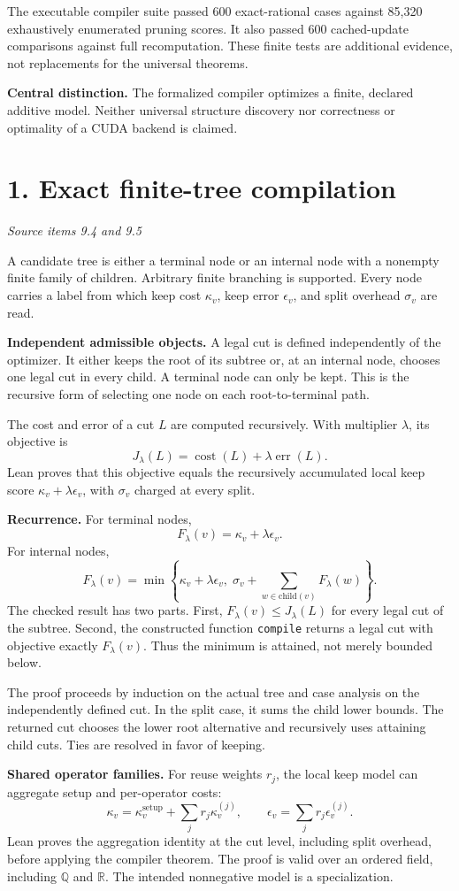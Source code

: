 \documentclass[11pt]{article}
\newcommand{\R}{\mathbb R}\newcommand{\Q}{\mathbb Q}
\newcommand{\cost}{\operatorname{cost}}\newcommand{\err}{\operatorname{err}}
\newcommand{\code}[1]{\texttt{\small #1}}
\newcommand{\pageheading}[2]{\section*{\color{ink}#1}\textit{#2}\par}
\begin{document}
The executable compiler suite passed 600 exact-rational cases against 85,320 exhaustively enumerated pruning scores. It also passed 600 cached-update comparisons against full recomputation. These finite tests are additional evidence, not replacements for the universal theorems.

\textbf{Central distinction.} The formalized compiler optimizes a finite, declared additive model. Neither universal structure discovery nor correctness or optimality of a CUDA backend is claimed.

\newpage
\pageheading{1. Exact finite-tree compilation}{Source items 9.4 and 9.5}
A candidate tree is either a terminal node or an internal node with a nonempty finite family of children. Arbitrary finite branching is supported. Every node carries a label from which keep cost $\kappa_v$, keep error $\epsilon_v$, and split overhead $\sigma_v$ are read.

\textbf{Independent admissible objects.} A legal cut is defined independently of the optimizer. It either keeps the root of its subtree or, at an internal node, chooses one legal cut in every child. A terminal node can only be kept. This is the recursive form of selecting one node on each root-to-terminal path.

The cost and error of a cut $L$ are computed recursively. With multiplier $\lambda$, its objective is
\[
J_\lambda(L)=\cost(L)+\lambda\err(L).
\]
Lean proves that this objective equals the recursively accumulated local keep score $\kappa_v+\lambda\epsilon_v$, with $\sigma_v$ charged at every split.

\textbf{Recurrence.} For terminal nodes,
\[
F_\lambda(v)=\kappa_v+\lambda\epsilon_v.
\]
For internal nodes,
\[
\boxed{F_\lambda(v)=\min\left\{\kappa_v+\lambda\epsilon_v,
\;\sigma_v+\sum_{w\in\mathrm{child}(v)}F_\lambda(w)\right\}.}
\]
The checked result has two parts. First, $F_\lambda(v)\leq J_\lambda(L)$ for every legal cut of the subtree. Second, the constructed function \code{compile} returns a legal cut with objective exactly $F_\lambda(v)$. Thus the minimum is attained, not merely bounded below.

The proof proceeds by induction on the actual tree and case analysis on the independently defined cut. In the split case, it sums the child lower bounds. The returned cut chooses the lower root alternative and recursively uses attaining child cuts. Ties are resolved in favor of keeping.

\textbf{Shared operator families.} For reuse weights $r_j$, the local keep model can aggregate setup and per-operator costs:
\[
\kappa_v=\kappa_v^{\mathrm{setup}}+\sum_jr_j\kappa_v^{(j)},
\qquad \epsilon_v=\sum_jr_j\epsilon_v^{(j)}.
\]
Lean proves the aggregation identity at the cut level, including split overhead, before applying the compiler theorem. The proof is valid over an ordered field, including $\Q$ and $\R$. The intended nonnegative model is a specialization.
\end{document}

